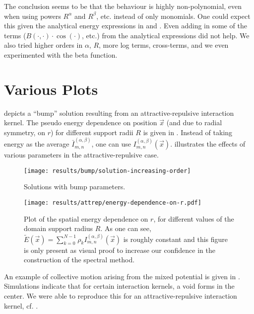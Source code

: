 The conclusion seems to be that the behaviour is highly non-polynomial, even when using powers $R^\alpha$ and $R^\beta$, etc. instead of only monomials.
One could expect this given the analytical energy expressions in  and \cite{2017-explicit-solutions}.
Even adding in some of the terms ($B(\cdot, \cdot) \cdot \cos(\cdot)$, etc.) from the analytical expressions did not help.
We also tried higher orders in $\alpha$, $R$, more log terms, cross-terms, and we even experimented with the beta function.

\chapter{Various Plots}
\label{appendix:various-plots}
 depicts a ``bump'' solution resulting from an attractive-repulsive interaction kernel.
The pseudo energy dependence on position $\vec{x}$ (and due to radial symmetry, on $r$) for different support radii $R$ is given in .
Instead of taking energy as the average $\bar{I}_{m,n}^{(\alpha,\beta)}$, one can use ${I}_{m,n}^{(\alpha,\beta)}(\vec{x})$.
 illustrates the effects of various parameters in the attractive-repulsive case.

\begin{figure}[H]
  \centering
  \texttt{[image: results/bump/solution-increasing-order]}
  \caption[Bump parameter solutions]{Solutions with bump parameters.}
  \label{fig:bump-solutions}
\end{figure}

\begin{figure}[H]
  \centering
  \texttt{[image: results/attrep/energy-dependence-on-r.pdf]}
  \caption[Spatial energy dependence on $r$]{Plot of the spatial energy dependence on $r$, for different values of the domain support radius $R$. As one can see, $\tilde{E}(\vec{x}) = \sum_{k=0}^{N-1} \rho_k {I}_{m,n}^{(\alpha,\beta)}(\vec{x})$ is roughly constant and this figure is only present as visual proof to increase our confidence in the construction of the spectral method.}
  \label{fig:spatial-energy-dependence}
\end{figure}
\pagebreak

An example of collective motion arising from the mixed potential is given in .
Simulations indicate that for certain interaction kernels, a void forms in the center.
We were able to reproduce this for an attractive-repulsive interaction kernel, cf. .

